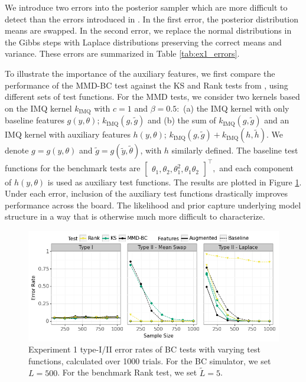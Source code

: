 \documentclass{article}
\begin{document}
We introduce two errors into the posterior sampler which are more difficult to detect than the errors introduced in \cite{gandy_unit_2020}. In the first error, the posterior distribution means are swapped. In the second error, we replace the normal distributions in the Gibbs steps with Laplace distributions preserving the correct means and variance. These errors are summarized in Table \ref{tab:ex1_errors}.

To illustrate the importance of the auxiliary features, we first compare the performance of the MMD-BC test against the KS and Rank tests from \cite{gandy_unit_2020}, using different sets of test functions. 
For the MMD tests, we consider two kernels based on the IMQ kernel $k_{\mathrm{IMQ}}$ with $c=1$ and $\beta=0.5:$ 
(a) the IMQ kernel with only baseline features $g(y, \theta)$; $k_{\mathrm{IMQ}}(g, \tilde{g})$ and 
(b) the sum of $k_{\mathrm{IMQ}}(g, \tilde{g})$ and an IMQ kernel with auxiliary features $h(y, \theta)$; $k_{\mathrm{IMQ}}(g, \tilde{g}) + k_{\mathrm{IMQ}}(h, \tilde{h})$. We denote $g=g(y, \theta)$ and $\tilde{g}=g(\tilde{y}, \tilde{\theta})$, with $h$ similarly defined. 
The baseline test functions for the benchmark tests are $\begin{bmatrix} \theta_{1}, \theta_{2}, \theta_{1}^{2}, \theta_{1}\theta_{2} \end{bmatrix}^\top,$ and each component of $h(y, \theta)$ is used as auxiliary test functions. 
The results are plotted in Figure \ref{fig:ex1_aux}. Under each error, inclusion of the auxiliary test functions drastically improves performance across the board. The likelihood and prior capture underlying model structure in a way that is otherwise much more difficult to characterize.

\begin{figure}
    \centering
    \includegraphics[width=\textwidth]{figures/results_1.png}
    \caption{
        Experiment 1 type-I/II error rates of BC tests with varying test functions, calculated over 1000 trials. 
        For the BC simulator, we set $L=500$.
        For the benchmark Rank test, we set $\tilde{L}=5$.
    }
    \label{fig:ex1_aux}
\end{figure}
\end{document}
